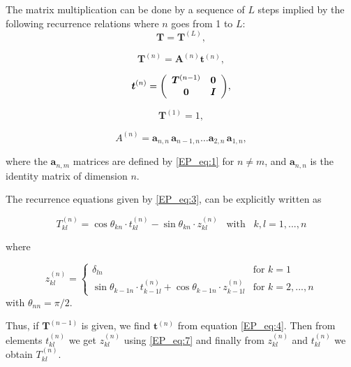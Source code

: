 \documentclass[preprint,amsmath,amssymb,superscriptaddress,showpacs,pre]{revtex4-1}
\let\originalleft\left
\let\originalright\right
\renewcommand{\left}{\mathopen{}\mathclose\bgroup\originalleft}
\renewcommand{\right}{\aftergroup\egroup\originalright}
\begin{document}
The matrix multiplication  can be done by a sequence of $L$ steps  implied by the following recurrence relations where $n$ goes from 1 to $L$:
\begin{equation}
	\bm T=\bm T^{(L)},
	\label{EP_eq:2}
\end{equation}

\begin{equation}
\bm T^{(n)}= \bm A^{(n)} \bm t^{(n)},
\label{EP_eq:3}
\end{equation}

\begin{equation} 
\bm t^{(n)} =  \left(
\begin{array}{cc}
\bm T^{(n-1)} & \bm 0  \\
\bm 0 &  \bm I\\
\end{array}
\right),
\label{EP_eq:4}
\end{equation}

\begin{equation} 
\bm T^{(1)}=1,
\label{EP_eq:init}
\end{equation}


\begin{equation}
A^{(n)}= \bm a_{n,n}\,\bm a_{n-1,n}\dotsc\bm a_{2,n} \,\bm a_{1,n} ,
\label{EP_eq:5}
\end{equation}

where the $\bm a_{n,m}$ matrices are defined by \eqref{EP_eq:1} for $n\neq m$, and $\bm a_{n,n}$ is the identity matrix of dimension $n$.

The recurrence equations given by \eqref{EP_eq:3},  can be explicitly written as 

\begin{equation}
T^{(n)}_{kl}=\cos\theta_{kn} \cdot t^{(n)}_{kl}-\sin\theta_{kn}\cdot z^{(n)}_{kl}\;\;\; \text{with} \;\;\; k,l=1,...,n
\label{EP_eq:6}
\end{equation}

where

\begin{equation}
z^{(n)}_{kl} =
\begin{cases}
\delta_{ln} & \text{for $k=1$}\\
\sin\theta_{k-1 n}\cdot t^{(n)}_{k-1 l}+\cos\theta_{k-1 n}\cdot z^{(n)}_{k-1 l} & \text{for $k=2,...,n$}  
\end{cases}
\label{EP_eq:7}
\end{equation}
with $\theta_{nn}=\pi/2$.

Thus, if $\bm T^{(n-1)}$ is given, we find $\bm t^{(n)}$ from equation \eqref{EP_eq:4}. Then from elements $t_{kl}^{(n)}$ we get $z_{kl}^{(n)}$ using \eqref{EP_eq:7} and finally from $z_{kl}^{(n)}$ and $t_{kl}^{(n)}$ we obtain $T^{(n)}_{kl}$. 
\end{document}
